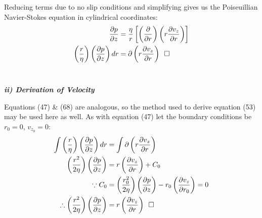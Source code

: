 \documentclass[titlepage]{article}
\begin{document}
\noindent Reducing terms due to no slip conditions and simplifying gives us the Poiseuillian Navier-Stokes equation in cylindrical coordinates: 
\begingroup
    \addtolength\jot{6pt}
    \begin{align}
        \displaystyle\frac{\partial{p}}{\partial{z}}&=\displaystyle\frac{\eta}{r}\left[\left(\displaystyle\frac{\partial}{\partial{r}}\right)\left(r\displaystyle\frac{\partial{v_{z}}}{\partial{r}}\right)\right] \\
        \left(\displaystyle\frac{r}{\eta}\right)\left(\displaystyle\frac{\partial{p}}{\partial{z}}\right)dr&=\partial\left(r\displaystyle\frac{\partial{v_{z}}}{\partial{r}}\right)\hspace*{5pt}\square
    \end{align}
\endgroup
\\
\begin{center}
    \textbf{\emph{ii) Derivation of Velocity}}
\end{center}
\noindent Equations (47) \& (68) are analogous, so the method used to derive equation (53) may be used here as well. As with equation (47) let the boundary conditions be $r_{0}=0$, $v_{z_{0}}=0$:
\begingroup
    \addtolength\jot{6pt}
    \begin{align}
        \int{\left(\displaystyle\frac{r}{\eta}\right)\left(\displaystyle\frac{\partial{p}}{\partial{z}}\right)dr}&=\int{\partial\left(r\displaystyle\frac{\partial{v_{z}}}{\partial{r}}\right)} \\
        \left(\displaystyle\frac{r^2}{2\eta}\right)\left(\frac{\partial{p}}{\partial{z}}\right)&=r\left(\displaystyle\frac{\partial{v_{z}}}{\partial{r}}\right)+C_{0}\\
        \because C_{0}&=\left(\displaystyle\frac{r_{0}^2}{2\eta}\right)\left(\frac{\partial{p}}{\partial{z}}\right)-r_{0}\left(\displaystyle\frac{\partial{v_{z}}}{\partial{r_{0}}}\right)=0\\
        \therefore\left(\displaystyle\frac{r^2}{2\eta}\right)\left(\frac{\partial{p}}{\partial{z}}\right)&=r\left(\displaystyle\frac{\partial{v_{z}}}{\partial{r}}\right)\hspace*{5pt}\square
    \end{align}
\endgroup

\newpage
\end{document}

